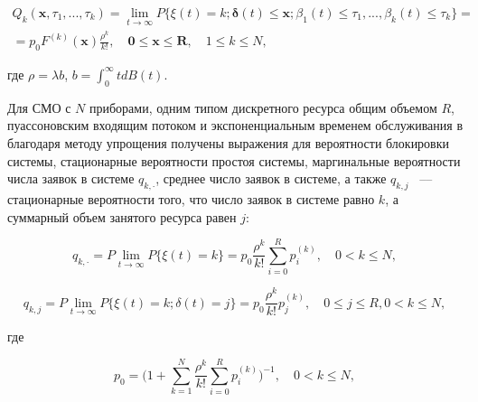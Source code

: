 \documentclass[a4paper,12pt]{article}
\begin{document}
\begin{equation}

\begin{gathered}

Q_k(\mathbf{x},\tau_1,...,\tau_k)=\lim_{t\rightarrow \infty} P \{ \xi(t)=k;\boldsymbol{\delta}(t)\leq \mathbf{x}; \beta_1(t) \leq \tau_1,...,\beta_k(t) \leq \tau_k  \}=\\

=p_0 F^{(k)}(\mathbf{x})\frac{\rho^{k}}{k!}, \quad

\mathbf{0} \leq \mathbf{x} \leq \mathbf{R}, \quad 1\leq k \leq N,

\end{gathered}

\end{equation}

где $\rho=\lambda b$, $b=\int_{0}^{\infty}tdB(t)$.



Для СМО с $N$ приборами, одним типом дискретного ресурса общим объемом $R$, пуассоновским входящим потоком и экспоненциальным временем обслуживания в \cite{Sopin_4_2015,Sopin_5_2015} благодаря методу упрощения получены выражения для вероятности блокировки системы, стационарные вероятности простоя системы, маргинальные вероятности числа заявок в системе $q_{k,\cdot}$, среднее число заявок в системе, а также $q_{k,j}$ ~--– стационарные вероятности того, что число заявок в системе равно $k$, а суммарный объем занятого ресурса равен $j$:

\begin{equation}

q_{k,\cdot}=P\lim_{t\rightarrow \infty}P\{ \xi(t)=k \}=p_0\frac{\rho^k}{k!}\sum_{i=0}^{R}p_i^{(k)},

\quad 0<k\leq N,

\end{equation}

\begin{equation}

q_{k,j}=P\lim_{t\rightarrow \infty}P \{ \xi(t)=k; \delta(t)=j\}=p_0\frac{\rho^k}{k!}p_j^{(k)},

\quad 0\leq j\leq R, 0<k\leq N,

\end{equation}

где

\begin{equation}

p_0=\bigg( 1+\sum_{k=1}^{N}\frac{\rho^k}{k!}\sum_{i=0}^{R}p_i^{(k)} \bigg )^{-1},

\quad 0<k\leq N,

\end{equation}
\end{document}
